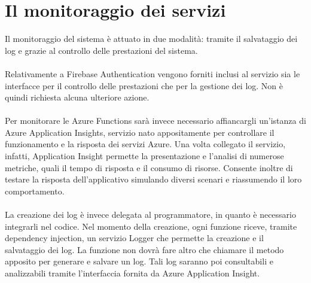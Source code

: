 \section{Il monitoraggio dei servizi}

Il monitoraggio del sistema è attuato in due modalità: 
tramite il salvataggio dei log e grazie al controllo delle prestazioni del sistema.\\
\\
Relativamente a Firebase Authentication vengono forniti inclusi al servizio 
sia le interfacce per il controllo delle prestazioni che per la gestione dei log. 
Non è quindi richiesta alcuna ulteriore azione.\\
\\
Per monitorare le Azure Functions sarà invece necessario 
affiancargli un'istanza di Azure Application Insights, 
servizio nato appositamente per controllare il funzionamento e la risposta dei servizi Azure. 
Una volta collegato il servizio, infatti, 
Application Insight permette la presentazione e l'analisi di numerose metriche, 
quali il tempo di risposta e il consumo di risorse. 
Consente inoltre di testare la risposta dell'applicativo 
simulando diversi scenari e riassumendo il loro comportamento.\\
\\
La creazione dei log è invece delegata al programmatore, 
in quanto è necessario integrarli nel codice. 
Nel momento della creazione, ogni funzione riceve, tramite dependency injection, 
un servizio Logger che permette la creazione e il salvataggio dei log.
La funzione non dovrà fare altro che chiamare il metodo apposito per generare e salvare un log.
Tali log saranno poi consultabili e analizzabili tramite l’interfaccia fornita da Azure Application Insight.\\
\clearpage
